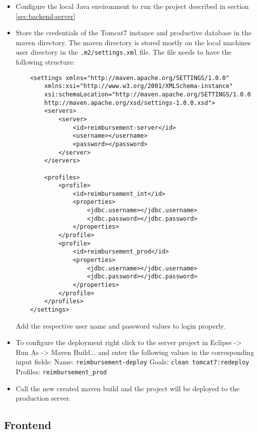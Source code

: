 \begin{itemize}
    \item Configure the local Java environment to run the project described in section \ref{sec:backend-server} 
    \item Store the credentials of the Tomcat7 instance and productive database in the maven directory. The maven directory is stored mostly on the local machines user directory in the \texttt{.m2/settings.xml} file. The file needs to have the following structure:

    \begin{lstlisting}
    <settings xmlns="http://maven.apache.org/SETTINGS/1.0.0"
        xmlns:xsi="http://www.w3.org/2001/XMLSchema-instance"
        xsi:schemaLocation="http://maven.apache.org/SETTINGS/1.0.0
        http://maven.apache.org/xsd/settings-1.0.0.xsd">
    	<servers>
    		<server>
    			<id>reimbursement-server</id>
    			<username></username>
    			<password></password>
    		</server>
    	</servers>
    
    	<profiles>
    		<profile>
    			<id>reimbursement_int</id>
    			<properties>
    				<jdbc.username></jdbc.username>
    				<jdbc.password></jdbc.password>
    			</properties>
    		</profile>
    		<profile>
    			<id>reimbursement_prod</id>
    			<properties>
    				<jdbc.username></jdbc.username>
    				<jdbc.password></jdbc.password>
    			</properties>
    		</profile>
    	</profiles>
    </settings>
    \end{lstlisting}
    
    Add the respective user name and password values to login properly.
    
    \item To configure the deployment right click to the server project in Eclipse -> Run As -> Maven Build... and enter the following values in the corresponding input fields:
    \newline
    Name: \texttt{reimbursement-deploy}
    \newline
    Goals: \texttt{clean tomcat7:redeploy}
    \newline
    Profiles: \texttt{reimbursement\_prod}
    \item Call the new created maven build and the project will be deployed to the production server.  
    
\end{itemize}
    
\subsection{Frontend}

